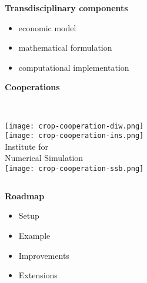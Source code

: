   \begin{frame}\textbf{Transdisciplinary components}\vspace{0.3cm}

  \begin{itemize}\setlength\itemsep{1em}
  \item economic model
  \item mathematical formulation
  \item computational implementation
  \end{itemize}
  \end{frame}
  \begin{frame}
  \textbf{Cooperations}\vspace{0.5cm}
  \begin{columns}[t]
  	\centering \\
  	\texttt{[image: crop-cooperation-diw.png]}\\
  	\vspace{1.0cm}
  	\texttt{[image: crop-cooperation-ins.png]} \\
  	\vspace{-0.5cm}
  	\footnotesize{Institute for \\ Numerical Simulation}
  	\centering \\
  	\texttt{[image: crop-cooperation-ssb.png]} \\
  	\vspace{-0.2cm}
  \end{columns}
  \end{frame}
\begin{frame}
\textbf{Roadmap}\vspace{0.5cm}
\begin{itemize}\setlength\itemsep{1em}
\item Setup
\item Example
\item Improvements
\item Extensions
\end{itemize}
\end{frame}
